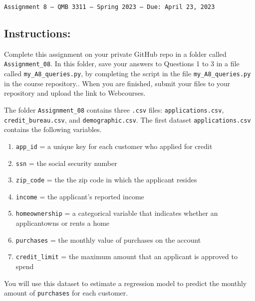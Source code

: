 \documentclass[11pt]{exam}
\begin{document}
\texttt{Assignment 8 --- QMB 3311 ---  Spring 2023  --- Due: April 23, 2023}

\subsection*{Instructions:}

Complete this assignment on your private GitHub repo in a folder called \texttt{Assignment\_08}. In this folder, save your answers to Questions 1 to 3 in a file called \texttt{my\_A8\_queries.py}, by completing the script in the file \texttt{my\_A8\_queries.py} in the course repository.. When you are finished, submit your files to your repository and upload the link to Webcourses.

    \begin{questions}

\question The folder \texttt{Assignment\_08} contains three \texttt{.csv} files: \texttt{applications.csv}, \texttt{credit\_bureau.csv}, and \texttt{demographic.csv}. The first dataset \texttt{applications.csv} contains the following variables.

\begin{enumerate}
\item \texttt{app\_id} = a unique key for each customer who applied for credit
\item \texttt{ssn} = the social security number
\item \texttt{zip\_code} = the the zip code in which the applicant resides
\item \texttt{income} = the applicant's reported income
\item \texttt{homeownership} = a categorical variable that indicates whether an applicantowns or rents a home
\item \texttt{purchases} = the monthly value of purchases on the account
\item \texttt{credit\_limit} = the maximum amount that an applicant is approved to spend
\end{enumerate}

You will use this dataset to estimate a regression model to predict the monthly amount of \texttt{purchases} for each customer.

\end{questions}
\end{document}
